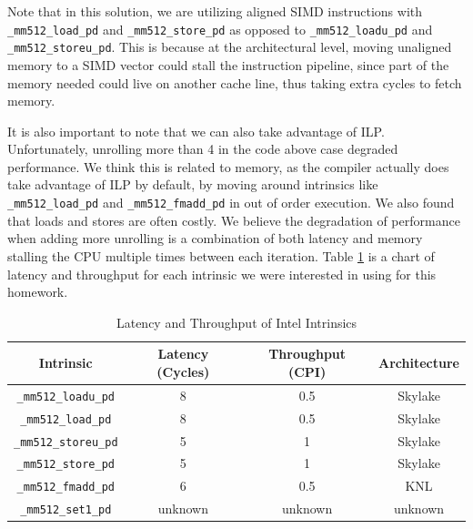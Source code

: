 \documentclass{article}
\begin{document}
Note that in this solution, we are utilizing aligned SIMD instructions with \verb|_mm512_load_pd| and \verb|_mm512_store_pd| as opposed to \verb|_mm512_loadu_pd| and \verb|_mm512_storeu_pd|. This is because at the architectural level, moving unaligned memory to a SIMD vector could stall the instruction pipeline, since part of the memory needed could live on another cache line, thus taking extra cycles to fetch memory.

It is also important to note that we can also take advantage of ILP. Unfortunately, unrolling more than 4 in the code above case degraded performance. We think this is related to memory, as the compiler actually does take advantage of ILP by default, by moving around intrinsics like \verb|_mm512_load_pd| and \verb|_mm512_fmadd_pd| in out of order execution. We also found that loads and stores are often costly. We believe the degradation of performance when adding more unrolling is a combination of both latency and memory stalling the CPU multiple times between each iteration. Table \ref{table:nonlin} is a chart of latency and throughput for each intrinsic we were interested in using for this homework.

\begin{table}[ht]
	\caption{Latency and Throughput of Intel Intrinsics} %
	\centering %
	\begin{tabular}{c c c c} %
		\hline\hline %
		Intrinsic               & Latency (Cycles) & Throughput (CPI) & Architecture \\ [0.5ex] %
		\hline %
		\verb|_mm512_loadu_pd|  & 8                & 0.5              & Skylake      \\
		\verb|_mm512_load_pd|   & 8                & 0.5              & Skylake      \\
		\verb|_mm512_storeu_pd| & 5                & 1                & Skylake      \\
		\verb|_mm512_store_pd|  & 5                & 1                & Skylake      \\
		\verb|_mm512_fmadd_pd|  & 6                & 0.5              & KNL          \\
		\verb|_mm512_set1_pd|   & unknown          & unknown          & unknown      \\
		[1ex] %
		\hline %
	\end{tabular}
	\label{table:nonlin} %
\end{table}
\end{document}

